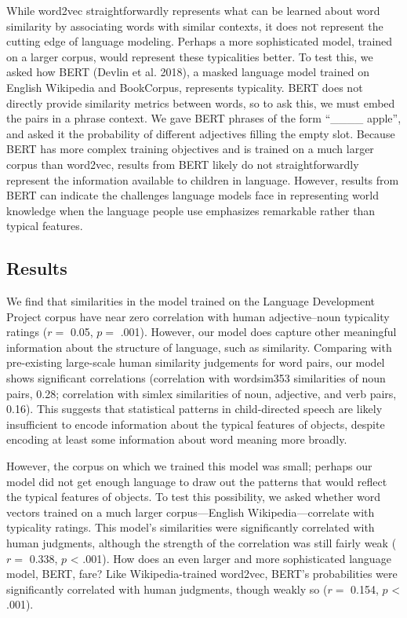 \documentclass{ucetd}
\begin{document}
While word2vec straightforwardly represents what can be learned about
word similarity by associating words with similar contexts, it does not
represent the cutting edge of language modeling. Perhaps a more
sophisticated model, trained on a larger corpus, would represent these
typicalities better. To test this, we asked how BERT (Devlin et al.
2018), a masked language model trained on English Wikipedia and
BookCorpus, represents typicality. BERT does not directly provide
similarity metrics between words, so to ask this, we must embed the
pairs in a phrase context. We gave BERT phrases of the form ``\_\_\_\_
apple'', and asked it the probability of different adjectives filling
the empty slot. Because BERT has more complex training objectives and is
trained on a much larger corpus than word2vec, results from BERT likely
do not straightforwardly represent the information available to children
in language. However, results from BERT can indicate the challenges
language models face in representing world knowledge when the language
people use emphasizes remarkable rather than typical features.

\hypertarget{results-1}{%
\subsection{Results}\label{results-1}}

We find that similarities in the model trained on the Language
Development Project corpus have near zero correlation with human
adjective--noun typicality ratings (\(r =\) 0.05, \(p =\) .001).
However, our model does capture other meaningful information about the
structure of language, such as similarity. Comparing with pre-existing
large-scale human similarity judgements for word pairs, our model shows
significant correlations (correlation with wordsim353 similarities of
noun pairs, 0.28; correlation with simlex similarities of noun,
adjective, and verb pairs, 0.16). This suggests that statistical
patterns in child-directed speech are likely insufficient to encode
information about the typical features of objects, despite encoding at
least some information about word meaning more broadly.

However, the corpus on which we trained this model was small; perhaps
our model did not get enough language to draw out the patterns that
would reflect the typical features of objects. To test this possibility,
we asked whether word vectors trained on a much larger corpus---English
Wikipedia---correlate with typicality ratings. This model's similarities
were significantly correlated with human judgments, although the
strength of the correlation was still fairly weak (\(r =\) 0.338, \(p\)
\textless{} .001). How does an even larger and more sophisticated
language model, BERT, fare? Like Wikipedia-trained word2vec, BERT's
probabilities were significantly correlated with human judgments, though
weakly so (\(r =\) 0.154, \(p\) \textless{} .001).
\end{document}
